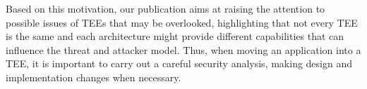 Based on this motivation, our publication aims at raising the attention to
possible issues of \acsp{TEE} that may be overlooked, highlighting that not
every \acs{TEE} is the same and each architecture might provide different
capabilities that can influence the threat and attacker model. Thus, when moving
an application into a \acs{TEE}, it is important to carry out a careful security
analysis, making design and implementation changes when necessary.